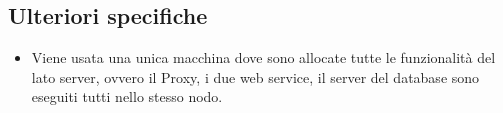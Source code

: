 



\subsection{Ulteriori specifiche}
\begin{itemize}
\item Viene usata una unica macchina dove sono allocate tutte le
  funzionalit\`a del lato server, ovvero il Proxy, i due web service,
  il server del database sono eseguiti tutti nello stesso nodo.
\end{itemize}


\begin{comment}
Gli elementi \verb'ricercans:ricercaStanza' e
\verb'prenotns:prenotazione' sono usati per realizzare le operazioni
di ricerca e prenotazione di una stanza, mentre quelli di
\verb'ricercans:ricercaStanzaResponse' e
\verb'prenotns:prenotazioneResponse' sono usati nella risposta alle
precedenti operazioni. Dato che l'encoding dei dati nei messaggi SOAP
\`e di tipo wrapped document-literal allora tali elementi sono il
possibile contenuto della parte Body dei messaggi SOAP scambiati
dall'applicazione.

Gli elementi di ricerca e di prenotazione di una stanza contengono le
informazioni sull'arrivo, la partenza e sulla stanza; un elemento
\verb'hotelns:stanza' contiene diverse informazioni che descrivono
una cambera d'albergo, tuttavia quelle necessarie per le operazioni di
ricerca e prenotazione sono il numero di adulti e il numero di bambini
ospitabili nella stanza, altre informazioni possono essere agginute
nella ricerca/prenotazione ma non sono obbligatorie (ad esempio il
codice del tipo della stanza nella ricerca, o l'eta dei bambini nella
prenotazione). Le altre informazioni realtive alla stanza sono
utilizzate nella risposta (ad esempio la descrizione della
stanza). L'elemento di prenotazione inoltre contiene informazioni
sull'identificatore della stanza che si vuole prenotare, e sulla
persona che effettua l'ordine e la carta di credito con cui effettuare
il pagamento. L'identificatore delle stanza deve essere uno di quelli
reperiti da precedenti risposte dell'hotel alle ricerce di stanza. Si
osserva che l'identificatore di una stanza, \verb'hotelns:stanzaId' in
'prenotazione' e 'prenotazioneResponse' \`e usato dall'hotel per
identificare univocamente una stanza con certi servizi ed un certo
costo, mentre il codice del tipo della stanza, 'codiceTipoStanza' in
identifica una macro categoria a cui la stanza appartiene.
\end{comment}


